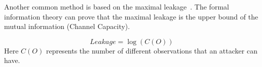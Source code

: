 Another common method is based on the maximal leakage~\cite{10.1007/978-3-642-00596-1_21,10.1007/978-3-642-31424-7_40,182946}.
The formal information theory can prove that the maximal leakage is the upper bound of the mutual 
information (Channel Capacity).

\begin{displaymath}
    \mathit{Leakage} = \log(C(O))
\end{displaymath}
Here $C(O)$ represents the number of different observations that an attacker can have. 
